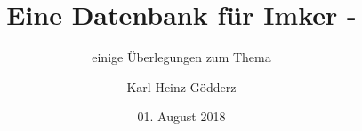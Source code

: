 \author{Karl-Heinz Gödderz}
\title{Eine Datenbank für Imker -}
\subtitle{einige Überlegungen zum Thema} 
\date{01. August 2018}

\maketitle
\newpage 
\tableofcontents
\newpage